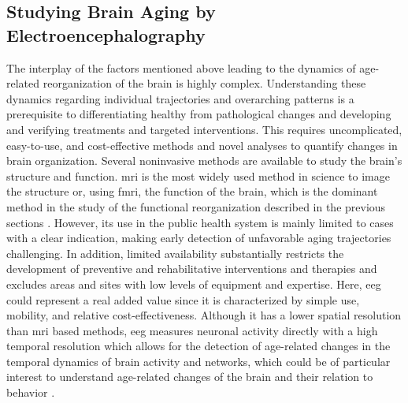 \subsection{Studying Brain Aging by Electroencephalography}
\label{theory:aging:EEG}
The interplay of the factors mentioned above leading to the dynamics of age-related reorganization of the brain is highly complex. Understanding these dynamics regarding individual trajectories and overarching patterns is a prerequisite to differentiating healthy from pathological changes and developing and verifying treatments and targeted interventions. This requires uncomplicated, easy-to-use, and cost-effective methods and novel analyses to quantify changes in brain organization. Several noninvasive methods are available to study the brain's structure and function. \Gls{mri} is the most widely used method in science to image the structure or, using \gls{fmri}, the function of the brain, which is the dominant method in the study of the functional reorganization described in the previous sections \cite{Reuter-Lorenz2010}. However, its use in the public health system is mainly limited to cases with a clear indication, making early detection of unfavorable aging trajectories challenging. In addition, limited availability substantially restricts the development of preventive and rehabilitative interventions and therapies and excludes areas and sites with low levels of equipment and expertise. Here, \gls{eeg} could represent a real added value since it is characterized by simple use, mobility, and relative cost-effectiveness. Although it has a lower spatial resolution than \gls{mri} based methods, \gls{eeg} measures neuronal activity directly with a high temporal resolution which allows for the detection of age-related changes in the temporal dynamics of brain activity and networks, which could be of particular interest to understand age-related changes of the brain and their relation to behavior \cite{Courtney2021}.

